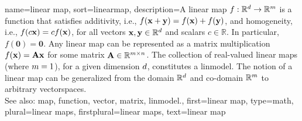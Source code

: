 {name={linear map},
sort={linearmap},
	description={A linear \gls{map} 
		$f: \mathbb{R}^d \rightarrow \mathbb{R}^m$ 
	    	is a \gls{function} that satisfies additivity, i.e.,
		$f({\bf x} + {\bf y}) = f({\bf x}) + f({\bf y})$, and homogeneity, i.e.,
		$f(c{\bf x}) = c f({\bf x})$, for all \glspl{vector} ${\bf x}, {\bf y} \in \mathbb{R}^d$ 
		and scalars $c \in \mathbb{R}$. In particular, $f(\mathbf{0}) = \mathbf{0}$. 
		Any linear \gls{map} can be represented as a \gls{matrix} multiplication 
		$f({\bf x}) = {\bf A} {\bf x}$ for some \gls{matrix} ${\bf A} \in \mathbb{R}^{m \times n}$. 
		The collection of real-valued linear \glspl{map} (where $m=1$), 
		for a given dimension $d$, constitutes a \gls{linmodel}. The notion 
		of a linear \gls{map} can be generalized from the \gls{domain} $\mathbb{R}^{d}$ 
		and \gls{co-domain} $\mathbb{R}^{m}$ to arbitrary \glspl{vectorspace}.
		\\
		See also: \gls{map}, \gls{function}, \gls{vector}, \gls{matrix}, \gls{linmodel}.},
	first={linear map},
	type=math, 
	plural={linear maps}, 
	firstplural={linear maps}, 
	text={linear map}
}

